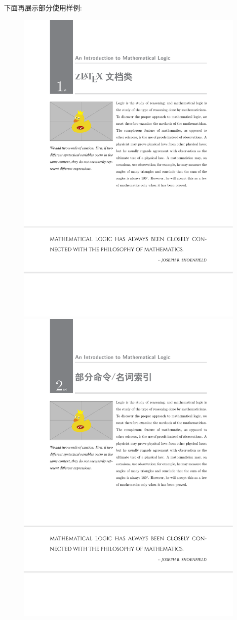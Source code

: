 下面再展示部分使用样例:
\begin{figure}[!htb]
  \centering
  \includegraphics[width=.45\linewidth]{./pics/fancy_chapter_1.pdf}
  \includegraphics[width=.45\linewidth]{./pics/fancy_chapter_2.pdf}
  

\end{figure}
